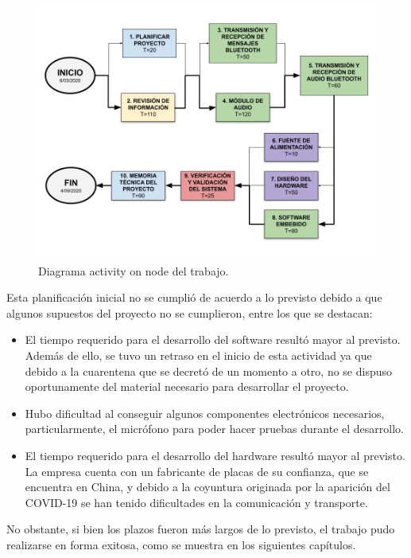 \begin{figure}[htpb]
	\centering
	\includegraphics[scale=0.4]{./Figures/ActivityOnNode.jpg}
	\caption{Diagrama activity on node del trabajo.}
	\label{fig:ActivityOnNode}
\end{figure}

Esta planificación inicial no se cumplió de acuerdo a lo previsto debido a que algunos supuestos del proyecto no se cumplieron, entre los que se destacan:

\begin{itemize}

\item El tiempo requerido para el desarrollo del software resultó mayor al previsto. Además de ello, se tuvo un retraso en el inicio de esta actividad ya que debido a la cuarentena que se decretó de un momento a otro, no se dispuso oportunamente del material necesario para desarrollar el proyecto.

\item Hubo dificultad al conseguir algunos componentes electrónicos necesarios, particularmente, el micrófono para poder hacer pruebas durante el desarrollo.

\item El tiempo requerido para el desarrollo del hardware resultó mayor al previsto. La empresa cuenta con un fabricante de placas de su confianza, que se encuentra en China, y debido a la coyuntura originada por la aparición del COVID-19 se han tenido dificultades en la comunicación y transporte.

\end{itemize}

No obstante, si bien los plazos fueron más largos de lo previsto, el trabajo pudo realizarse en forma exitosa, como se muestra en los siguientes capítulos.